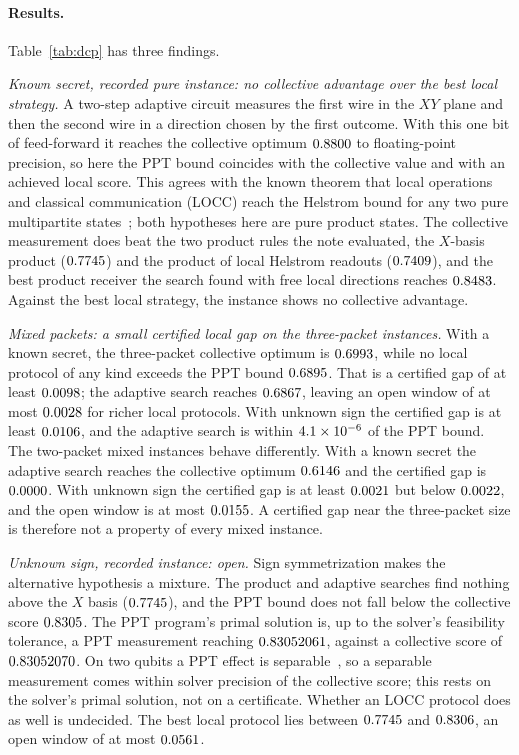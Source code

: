 \documentclass[10pt]{article}
\begin{document}
\paragraph{Results.} Table~\ref{tab:dcp} has three findings.

\emph{Known secret, recorded pure instance: no collective advantage over the best local strategy.} A two-step adaptive circuit measures the first wire in the $XY$ plane and then the second wire in a direction chosen by the first outcome. With this one bit of feed-forward it reaches the collective optimum $0.8800$ to floating-point precision, so here the PPT bound coincides with the collective value and with an achieved local score. This agrees with the known theorem that local operations and classical communication (LOCC) reach the Helstrom bound for any two pure multipartite states~\cite{VirmaniSacchiPlenioMarkham2001}; both hypotheses here are pure product states. The collective measurement does beat the two product rules the note evaluated, the $X$-basis product ($0.7745$) and the product of local Helstrom readouts ($0.7409$), and the best product receiver the search found with free local directions reaches $0.8483$. Against the best local strategy, the instance shows no collective advantage.

\emph{Mixed packets: a small certified local gap on the three-packet instances.} With a known secret, the three-packet collective optimum is $0.6993$, while no local protocol of any kind exceeds the PPT bound $0.6895$. That is a certified gap of at least $0.0098$; the adaptive search reaches $0.6867$, leaving an open window of at most $0.0028$ for richer local protocols. With unknown sign the certified gap is at least $0.0106$, and the adaptive search is within $4.1\times 10^{-6}$ of the PPT bound. The two-packet mixed instances behave differently. With a known secret the adaptive search reaches the collective optimum $0.6146$ and the certified gap is $0.0000$. With unknown sign the certified gap is at least $0.0021$ but below $0.0022$, and the open window is at most $0.0155$. A certified gap near the three-packet size is therefore not a property of every mixed instance.

\emph{Unknown sign, recorded instance: open.} Sign symmetrization makes the alternative hypothesis a mixture. The product and adaptive searches find nothing above the $X$ basis ($0.7745$), and the PPT bound does not fall below the collective score $0.8305$. The PPT program's primal solution is, up to the solver's feasibility tolerance, a PPT measurement reaching $0.83052061$, against a collective score of $0.83052070$. On two qubits a PPT effect is separable~\cite{Horodecki1996}, so a separable measurement comes within solver precision of the collective score; this rests on the solver's primal solution, not on a certificate. Whether an LOCC protocol does as well is undecided. The best local protocol lies between $0.7745$ and $0.8306$, an open window of at most $0.0561$.
\end{document}
